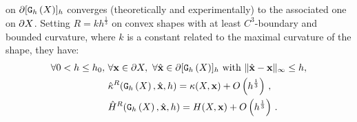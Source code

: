 \documentclass{llncs}
\begin{document}
on $\partial \lbrack \mathtt{G}_{h}\left(X\right) \rbrack_{h}$ converges (theoretically and experimentally) to the
associated one on $\partial X$.
%
%
Setting $R = kh^\frac{1}{3}$ on convex shapes
with at least $C^3$-boundary and bounded curvature, where $k$ is a constant
related to the maximal curvature of the shape, they have:
%
\begin{align}
\forall 0 < h \le h_0,\,\, &\forall \mathbf{x} \in \partial X,\,\,
\forall \hat{\mathbf{x}} \in \partial \lbrack \mathtt{G}_{h}\left(X\right) \rbrack_{h} \text{~with~} \| \hat{\mathbf{x}} -\mathbf{x}\|_\infty \le h, \nonumber \\
&\hat{\kappa}^{R}(\mathtt{G}_{h}\left(X\right), \hat{\mathbf{x}}, h) = \kappa(X, \mathbf{x}) + O\left(h^{\frac{1}{3}}\right)\,,\\
&\hat{H}^{R}(\mathtt{G}_{h}\left(X\right), \hat{\mathbf{x}}, h) = H(X, \mathbf{x}) + O\left(h^{\frac{1}{3}}\right)\,.
\end{align}
\end{document}
